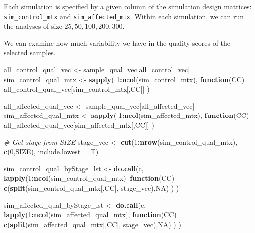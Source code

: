\documentclass[
]{book}
\newenvironment{Shaded}{\begin{snugshade}}{\end{snugshade}}
\newcommand{\CommentTok}[1]{\textcolor[rgb]{0.56,0.35,0.01}{\textit{#1}}}
\newcommand{\ControlFlowTok}[1]{\textcolor[rgb]{0.13,0.29,0.53}{\textbf{#1}}}
\newcommand{\DataTypeTok}[1]{\textcolor[rgb]{0.13,0.29,0.53}{#1}}
\newcommand{\DecValTok}[1]{\textcolor[rgb]{0.00,0.00,0.81}{#1}}
\newcommand{\KeywordTok}[1]{\textcolor[rgb]{0.13,0.29,0.53}{\textbf{#1}}}
\newcommand{\NormalTok}[1]{#1}
\newcommand{\OperatorTok}[1]{\textcolor[rgb]{0.81,0.36,0.00}{\textbf{#1}}}
\newcommand{\OtherTok}[1]{\textcolor[rgb]{0.56,0.35,0.01}{#1}}
\newcommand{\StringTok}[1]{\textcolor[rgb]{0.31,0.60,0.02}{#1}}
\begin{document}
Each simulation is specified by a given column of the simulation design matrices:
\texttt{sim\_control\_mtx} and \texttt{sim\_affected\_mtx}. Within each simulation, we can run
the analyses of size \(25, 50, 100, 200, 300\).

We can examine how much variability we have in the quality scores of the selected samples.

\begin{Shaded}
\begin{Highlighting}[]
\NormalTok{all\_control\_qual\_vec <{-}}\StringTok{ }\NormalTok{sample\_qual\_vec[all\_control\_vec]}
\NormalTok{sim\_control\_qual\_mtx <{-}}\StringTok{ }\KeywordTok{sapply}\NormalTok{(}
  \DecValTok{1}\OperatorTok{:}\KeywordTok{ncol}\NormalTok{(sim\_control\_mtx), }
  \ControlFlowTok{function}\NormalTok{(CC) all\_control\_qual\_vec[sim\_control\_mtx[,CC]]}
\NormalTok{ )}

\NormalTok{all\_affected\_qual\_vec <{-}}\StringTok{ }\NormalTok{sample\_qual\_vec[all\_affected\_vec]}
\NormalTok{sim\_affected\_qual\_mtx <{-}}\StringTok{ }\KeywordTok{sapply}\NormalTok{(}
  \DecValTok{1}\OperatorTok{:}\KeywordTok{ncol}\NormalTok{(sim\_affected\_mtx),  }
  \ControlFlowTok{function}\NormalTok{(CC) all\_affected\_qual\_vec[sim\_affected\_mtx[,CC]]}
\NormalTok{ )}

\CommentTok{\# Get stage from SIZE }
\NormalTok{stage\_vec <{-}}\StringTok{ }\KeywordTok{cut}\NormalTok{(}\DecValTok{1}\OperatorTok{:}\KeywordTok{nrow}\NormalTok{(sim\_control\_qual\_mtx), }\KeywordTok{c}\NormalTok{(}\DecValTok{0}\NormalTok{,SIZE), }\DataTypeTok{include.lowest =}\NormalTok{ T)}

\NormalTok{sim\_control\_qual\_byStage\_lst <{-}}\StringTok{ }\KeywordTok{do.call}\NormalTok{(}\StringTok{\textquotesingle{}c\textquotesingle{}}\NormalTok{, }
 \KeywordTok{lapply}\NormalTok{(}\DecValTok{1}\OperatorTok{:}\KeywordTok{ncol}\NormalTok{(sim\_control\_qual\_mtx), }
  \ControlFlowTok{function}\NormalTok{(CC) }\KeywordTok{c}\NormalTok{(}\KeywordTok{split}\NormalTok{(sim\_control\_qual\_mtx[,CC], stage\_vec),}\OtherTok{NA}\NormalTok{)}
\NormalTok{ )}
\NormalTok{)}

\NormalTok{sim\_affected\_qual\_byStage\_lst <{-}}\StringTok{ }\KeywordTok{do.call}\NormalTok{(}\StringTok{\textquotesingle{}c\textquotesingle{}}\NormalTok{, }
 \KeywordTok{lapply}\NormalTok{(}\DecValTok{1}\OperatorTok{:}\KeywordTok{ncol}\NormalTok{(sim\_affected\_qual\_mtx), }
  \ControlFlowTok{function}\NormalTok{(CC) }\KeywordTok{c}\NormalTok{(}\KeywordTok{split}\NormalTok{(sim\_affected\_qual\_mtx[,CC], stage\_vec),}\OtherTok{NA}\NormalTok{)}
\NormalTok{ )}
\NormalTok{)}


\end{Highlighting}
\end{Shaded}
\end{document}
